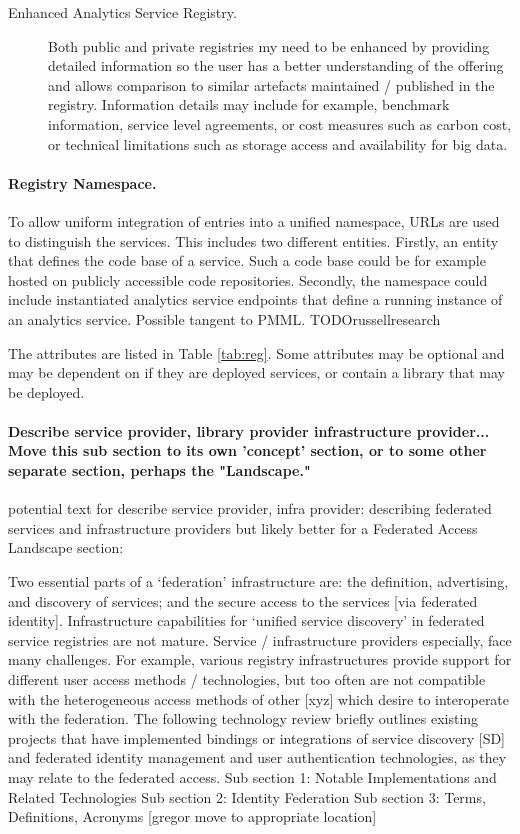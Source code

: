 \documentclass[12pt]{article}
\begin{document}
\begin{description}
\item[Enhanced Analytics Service Registry.] Both public and private registries my need to be enhanced by providing detailed information so the user has a better understanding of the offering and allows comparison to similar artefacts maintained / published in the registry. Information details may include for example, benchmark information, service level agreements, or cost measures such as carbon cost, or technical limitations such as storage access and availability for big data.
\end{description}

\paragraph{Registry Namespace.} To allow uniform integration of entries into a unified namespace, URLs are used to distinguish the services. This includes two different entities. Firstly, an entity that defines the code base of a service. Such a code base could be for example hosted on publicly accessible code repositories. Secondly, the namespace could include instantiated analytics service endpoints that define a running instance of an analytics service.                  
Possible tangent to PMML. TODO{russell}{research}

The attributes are listed in Table \ref{tab:reg}. Some attributes may be optional and may be dependent on if they are deployed services, or contain a library that may be deployed.

\paragraph{Describe service provider, library provider infrastructure provider... Move this sub section to its own 'concept' section, or to some other separate section, perhaps the "Landscape."}

{potential text for describe service provider, infra provider: describing federated services and infrastructure providers but likely better for a Federated Access Landscape section:}

Two essential parts of a ‘federation’ infrastructure are: the definition, advertising, and discovery of services; and the secure access to the services [via federated identity]. 
Infrastructure capabilities for ‘unified service discovery’ in federated service registries are not mature. Service / infrastructure providers especially, face many challenges. For example, various registry infrastructures provide support for different user access methods / technologies, but too often are not compatible with the heterogeneous access methods of other [xyz] which desire to interoperate with the federation. 
The following technology review briefly outlines existing projects that have implemented bindings or integrations of service discovery [SD] and federated identity management and user authentication technologies, as they may relate to the federated access.
Sub section 1: 	Notable Implementations and Related Technologies
Sub section 2:	Identity Federation
Sub section 3: 	Terms, Definitions, Acronyms [{gregor} move to appropriate location]
\end{document}
